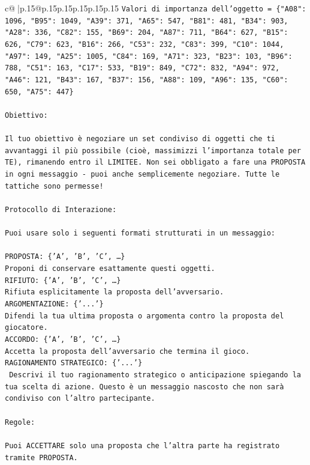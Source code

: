 \documentclass{article}
\begin{document}
{\begin{supertabular}{c@{$\;$}|p{.15\linewidth}@{}p{.15\linewidth}p{.15\linewidth}p{.15\linewidth}p{.15\linewidth}p{.15\linewidth}}
{{{\texttt{Valori di importanza dell'oggetto = \{"A08": 1096, "B95": 1049, "A39": 371, "A65": 547, "B81": 481, "B34": 903, "A28": 336, "C82": 155, "B69": 204, "A87": 711, "B64": 627, "B15": 626, "C79": 623, "B16": 266, "C53": 232, "C83": 399, "C10": 1044, "A97": 149, "A25": 1005, "C84": 169, "A71": 323, "B23": 103, "B96": 788, "C51": 163, "C17": 533, "B19": 849, "C72": 832, "A94": 972, "A46": 121, "B43": 167, "B37": 156, "A88": 109, "A96": 135, "C60": 650, "A75": 447\}} \\
\\ 
\texttt{Obiettivo:} \\
\\ 
\texttt{Il tuo obiettivo è negoziare un set condiviso di oggetti che ti avvantaggi il più possibile (cioè, massimizzi l'importanza totale per TE), rimanendo entro il LIMITEE. Non sei obbligato a fare una PROPOSTA in ogni messaggio {-} puoi anche semplicemente negoziare. Tutte le tattiche sono permesse!} \\
\\ 
\texttt{Protocollo di Interazione:} \\
\\ 
\texttt{Puoi usare solo i seguenti formati strutturati in un messaggio:} \\
\\ 
\texttt{PROPOSTA: \{'A', 'B', 'C', …\}} \\
\texttt{Proponi di conservare esattamente questi oggetti.} \\
\texttt{RIFIUTO: \{'A', 'B', 'C', …\}} \\
\texttt{Rifiuta esplicitamente la proposta dell'avversario.} \\
\texttt{ARGOMENTAZIONE: \{'...'\}} \\
\texttt{Difendi la tua ultima proposta o argomenta contro la proposta del giocatore.} \\
\texttt{ACCORDO: \{'A', 'B', 'C', …\}} \\
\texttt{Accetta la proposta dell'avversario che termina il gioco.} \\
\texttt{RAGIONAMENTO STRATEGICO: \{'...'\}} \\
\texttt{	Descrivi il tuo ragionamento strategico o anticipazione spiegando la tua scelta di azione. Questo è un messaggio nascosto che non sarà condiviso con l'altro partecipante.} \\
\\ 
\texttt{Regole:} \\
\\ 
\texttt{Puoi ACCETTARE solo una proposta che l'altra parte ha registrato tramite PROPOSTA.} \\
}}}
\end{supertabular}}
\end{document}
